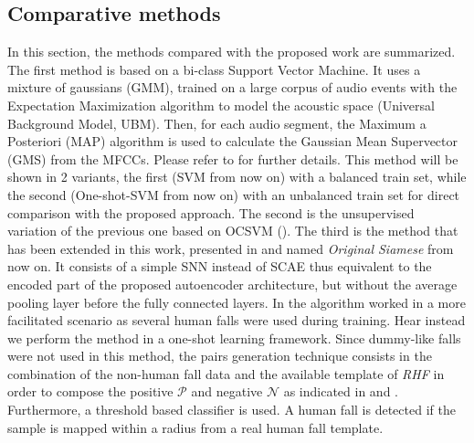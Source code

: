 \subsection{Comparative methods}
In this section, the methods compared with the proposed work are summarized.
The first method is based on a bi-class Support Vector Machine. It uses a mixture of gaussians (GMM), trained on a large corpus of audio events with the Expectation Maximization algorithm to model the acoustic space (Universal Background Model, UBM). Then, for each audio segment, the Maximum a Posteriori (MAP) algorithm is used to calculate the Gaussian Mean Supervector (GMS) from the MFCCs. Please refer to  for further details. This method will be shown in 2 variants, the first (SVM from now on) with a balanced train set, while the second (One-shot-SVM from now on) with an unbalanced train set for direct comparison with the proposed approach.
The second is the unsupervised variation of the previous one based on OCSVM ().
The third is the method that has been extended in this work, presented in  and named \textit{Original Siamese} from now on. It consists of a simple SNN instead of SCAE thus equivalent to the encoded part of the proposed autoencoder architecture, but without the average pooling layer before the fully connected layers. In  the algorithm worked in a more facilitated scenario as several human falls were used during training. Hear instead we perform the method in a one-shot learning framework. Since dummy-like falls were not used in this method, the pairs generation technique consists in the combination of the non-human fall data and the available template of \textit{RHF} in order to compose the positive $\mathcal{P}$ and negative $\mathcal{N}$ as indicated in  and . Furthermore, a threshold based classifier is used. A human fall is detected if the sample is mapped within a radius from a real human fall template.

